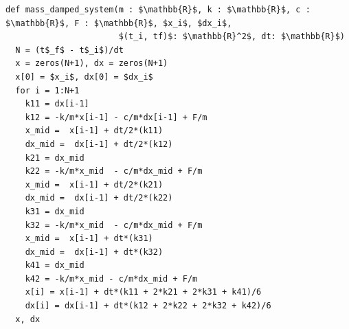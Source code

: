 \documentclass[border=10pt]{standalone}
\begin{document}
\begin{lstlisting}
def mass_damped_system(m : $\mathbb{R}$, k : $\mathbb{R}$, c : $\mathbb{R}$, F : $\mathbb{R}$, $x_i$, $dx_i$, 
                       $(t_i, tf)$: $\mathbb{R}^2$, dt: $\mathbb{R}$)
  N = (t$_f$ - t$_i$)/dt
  x = zeros(N+1), dx = zeros(N+1)
  x[0] = $x_i$, dx[0] = $dx_i$
  for i = 1:N+1
    k11 = dx[i-1]
    k12 = -k/m*x[i-1] - c/m*dx[i-1] + F/m
    x_mid =  x[i-1] + dt/2*(k11)
    dx_mid =  dx[i-1] + dt/2*(k12)
    k21 = dx_mid
    k22 = -k/m*x_mid  - c/m*dx_mid + F/m
    x_mid =  x[i-1] + dt/2*(k21)
    dx_mid =  dx[i-1] + dt/2*(k22)
    k31 = dx_mid
    k32 = -k/m*x_mid  - c/m*dx_mid + F/m
    x_mid =  x[i-1] + dt*(k31)
    dx_mid =  dx[i-1] + dt*(k32)
    k41 = dx_mid
    k42 = -k/m*x_mid - c/m*dx_mid + F/m
    x[i] = x[i-1] + dt*(k11 + 2*k21 + 2*k31 + k41)/6
    dx[i] = dx[i-1] + dt*(k12 + 2*k22 + 2*k32 + k42)/6
  x, dx
\end{lstlisting}
\end{document}
